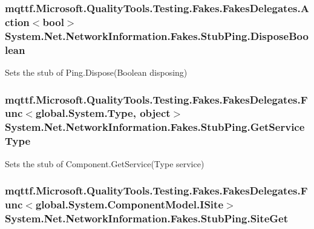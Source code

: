 \hypertarget{class_system_1_1_net_1_1_network_information_1_1_fakes_1_1_stub_ping_a4a0a62c9731c5654501769557f268909}{
\subsubsection[{Dispose\-Boolean}]{\setlength{\rightskip}{0pt plus 5cm}mqttf.\-Microsoft.\-Quality\-Tools.\-Testing.\-Fakes.\-Fakes\-Delegates.\-Action$<$bool$>$ System.\-Net.\-Network\-Information.\-Fakes.\-Stub\-Ping.\-Dispose\-Boolean}}\label{class_system_1_1_net_1_1_network_information_1_1_fakes_1_1_stub_ping_a4a0a62c9731c5654501769557f268909}


Sets the stub of Ping.\-Dispose(\-Boolean disposing)

\hypertarget{class_system_1_1_net_1_1_network_information_1_1_fakes_1_1_stub_ping_a52e6a202c82b6c1d118992d852f265b5}{
\subsubsection[{Get\-Service\-Type}]{\setlength{\rightskip}{0pt plus 5cm}mqttf.\-Microsoft.\-Quality\-Tools.\-Testing.\-Fakes.\-Fakes\-Delegates.\-Func$<$global.\-System.\-Type, object$>$ System.\-Net.\-Network\-Information.\-Fakes.\-Stub\-Ping.\-Get\-Service\-Type}}\label{class_system_1_1_net_1_1_network_information_1_1_fakes_1_1_stub_ping_a52e6a202c82b6c1d118992d852f265b5}


Sets the stub of Component.\-Get\-Service(\-Type service)

\hypertarget{class_system_1_1_net_1_1_network_information_1_1_fakes_1_1_stub_ping_a75fd80139a9561f70745e8f942fae06d}{
\subsubsection[{Site\-Get}]{\setlength{\rightskip}{0pt plus 5cm}mqttf.\-Microsoft.\-Quality\-Tools.\-Testing.\-Fakes.\-Fakes\-Delegates.\-Func$<$global.\-System.\-Component\-Model.\-I\-Site$>$ System.\-Net.\-Network\-Information.\-Fakes.\-Stub\-Ping.\-Site\-Get}}\label{class_system_1_1_net_1_1_network_information_1_1_fakes_1_1_stub_ping_a75fd80139a9561f70745e8f942fae06d}


